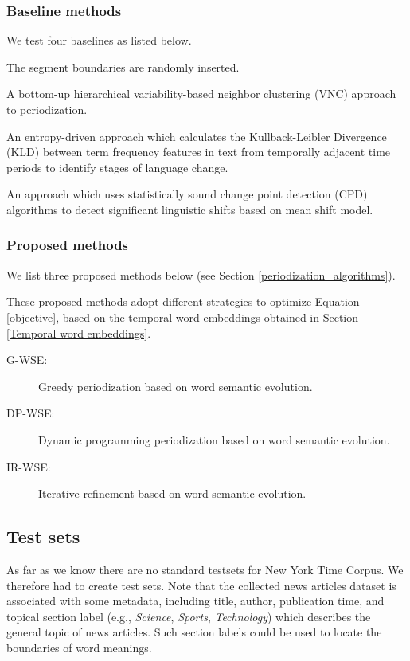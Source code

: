 \documentclass[output=paper]{langsci/langscibook}
\begin{document}
\subsubsection{Baseline methods} 
We test four baselines as listed below.
\begin{description}\sloppy
\item[Random:] The segment boundaries are randomly inserted.
\item[VNC \citep{gries2012variability}:] A bottom-up hierarchical variability-based neighbor clustering (VNC) approach to periodization.
\item[KLD \citep{degaetano2018using}:] An entropy-driven approach which calculates the Kullback-Leibler Divergence (KLD) between term frequency features in text from temporally adjacent time periods to identify stages of language change.
\item[CPD \citep{kulkarni2015statistically}:] An approach which uses statistically sound change point detection (CPD) algorithms to detect significant linguistic shifts based on mean shift model.
\end{description}

\subsubsection{Proposed methods}
 We list three proposed methods below  (see Section \ref{periodization_algorithms}).

These proposed methods adopt different strategies to optimize Equation \eqref{objective}, based on the temporal word embeddings obtained in Section \ref{Temporal word embeddings}.

\begin{description}
\item[G-WSE:] Greedy periodization based on word semantic evolution. 
\item[DP-WSE:] Dynamic programming periodization based on word semantic evolution. 
\item[IR-WSE:] Iterative refinement based on word semantic evolution.
\end{description}

\subsection{Test sets}
As far as we know there are no standard testsets for New York Time Corpus. We therefore had to create test sets. Note that the collected news articles dataset is associated with some metadata, including title, author, publication time, and topical section label (e.g., \textit{Science}, \textit{Sports}, \textit{Technology}) which describes the general topic of news articles. Such section labels could be used to locate the boundaries of word meanings.
\end{document}
